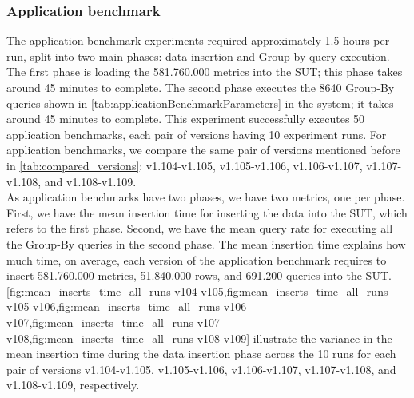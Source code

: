 \subsubsection{Application benchmark}
The application benchmark experiments required approximately 1.5 hours per run, split into two main phases: data insertion and Group-by query execution. The first phase is loading the 581.760.000 metrics into the  \ac{SUT}; this phase takes around 45 minutes to complete. The second phase executes the 8640 Group-By queries shown in \cref{tab:applicationBenchmarkParameters} in the system; it takes around 45 minutes to complete. This experiment successfully executes 50 application benchmarks, each pair of versions having 10 experiment runs. For application benchmarks, we compare the same pair of versions mentioned before in \cref{tab:compared_versions}: v1.104-v1.105, v1.105-v1.106, v1.106-v1.107, v1.107-v1.108, and v1.108-v1.109. \\
As application benchmarks have two phases, we have two metrics, one per phase. First, we have the mean insertion time for inserting the data into the \ac{SUT}, which refers to the first phase. Second, we have the mean query rate for executing all the Group-By queries in the second phase. The mean insertion time explains how much time, on average, each version of the application benchmark requires to insert 581.760.000 metrics, 51.840.000 rows, and 691.200 queries into the \ac{SUT}. \cref{fig:mean_inserts_time_all_runs-v104-v105,fig:mean_inserts_time_all_runs-v105-v106,fig:mean_inserts_time_all_runs-v106-v107,fig:mean_inserts_time_all_runs-v107-v108,fig:mean_inserts_time_all_runs-v108-v109} illustrate the variance in the mean insertion time during the data insertion phase across the 10 runs for each pair of versions v1.104-v1.105, v1.105-v1.106, v1.106-v1.107, v1.107-v1.108, and v1.108-v1.109, respectively.

